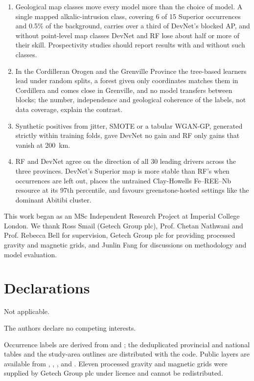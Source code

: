 \documentclass[pdflatex,sn-apa]{sn-jnl}
\begin{document}
\begin{enumerate}
\item Geological map classes move every model more than the choice of model. A single mapped alkalic-intrusion class, covering 6 of 15 Superior occurrences and 0.5\% of the background, carries over a third of DevNet's blocked AP, and without point-level map classes DevNet and RF lose about half or more of their skill. Prospectivity studies should report results with and without such classes.
\item In the Cordilleran Orogen and the Grenville Province the tree-based learners lead under random splits, a forest given only coordinates matches them in Cordillera and comes close in Grenville, and no model transfers between blocks; the number, independence and geological coherence of the labels, not data coverage, explain the contrast.
\item Synthetic positives from jitter, SMOTE or a tabular WGAN-GP, generated strictly within training folds, gave DevNet no gain and RF only gains that vanish at 200~km.
\item RF and DevNet agree on the direction of all 30 leading drivers across the three provinces. DevNet's Superior map is more stable than RF's when occurrences are left out, places the untrained Clay-Howells Fe--REE--Nb resource at its 97th percentile, and favours greenstone-hosted settings like the dominant Abitibi cluster.
\end{enumerate}

\backmatter

This work began as an MSc Independent Research Project at Imperial College London. We thank Ross Smail (Getech Group plc), Prof. Chetan Nathwani and Prof. Rebecca Bell for supervision, Getech Group plc for providing processed gravity and magnetic grids, and Junlin Fang for discussions on methodology and model evaluation.

\section*{Declarations}

Not applicable.

The authors declare no competing interests.

Occurrence labels are derived from \citet{Orris2018} and \citet{Parsa2024}; the deduplicated provincial and national tables and the study-area outlines are distributed with the code. Public layers are available from \citet{McCafferty2023}, \citet{Jobin2017}, \citet{Miles2016}, \citet{BradleyDC2008} and \citet{Wheeler1996}. Eleven processed gravity and magnetic grids were supplied by Getech Group plc under licence and cannot be redistributed.
\end{document}
